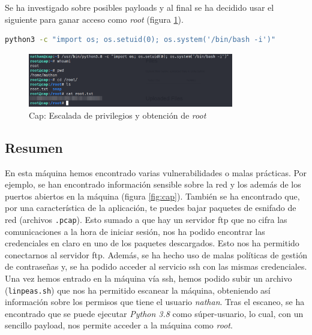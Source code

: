 Se ha investigado sobre posibles payloads y al final se ha decidido usar el siguiente para ganar acceso como \textit{root} (figura \ref{fig:cap-root}).
\begin{lstlisting}[language=bash]
python3 -c "import os; os.setuid(0); os.system('/bin/bash -i')"
\end{lstlisting}

\begin{figure}[h]
    \centering
    \includegraphics[width=0.8\textwidth]{images/machines/cap/root.png}
    \caption{Cap: Escalada de privilegios y obtención de \textit{root}}
    \label{fig:cap-root}
\end{figure}

\subsection{Resumen}

En esta máquina hemos encontrado varias vulnerabilidades o malas prácticas. Por ejemplo, se han encontrado información sensible sobre la red y los además de los puertos abiertos en la máquina (figura \ref{fig:cap}). También se ha encontrado que, por una característica de la aplicación, te puedes bajar paquetes de esnifado de red (archivos \texttt{.pcap}). Esto sumado a que hay un servidor \acrshort{ftp} que no cifra las comunicaciones a la hora de iniciar sesión, nos ha podido encontrar las credenciales en claro en uno de los paquetes descargados. Esto nos ha permitido conectarnos al servidor \acrshort{ftp}. Además, se ha hecho uso de malas políticas de gestión de contraseñas y, se ha podido acceder al servicio \acrshort{ssh} con las mismas credenciales.\\

Una vez hemos entrado en la máquina vía \acrshort{ssh}, hemos podido subir un archivo (\texttt{linpeas.sh}) que nos ha permitido escanear la máquina, obteniendo así información sobre los permisos que tiene el usuario \textit{nathan}. Tras el escaneo, se ha encontrado que se puede ejecutar \textit{Python 3.8} como súper-usuario, lo cual, con un sencillo payload, nos permite acceder a la máquina como \textit{root}.